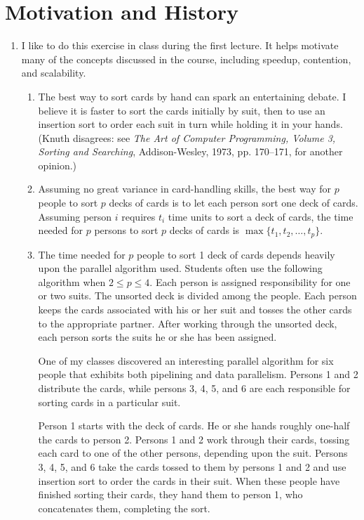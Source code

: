 \chapter{Motivation and History}
\begin{enumerate}
\item I like to do this exercise in class during the first lecture.
      It helps motivate many of the concepts discussed in the course, including
      speedup, contention, and scalability.

      \begin{enumerate}
      \item
      The best way to sort cards by hand can spark an entertaining debate.
      I believe it is faster to sort the cards initially by suit, then to
      use an insertion sort to order each suit in turn while holding it in
      your hands.
      (Knuth disagrees:  see {\sl The Art of Computer Programming,
      Volume 3, Sorting and Searching\/}, Addison-Wesley, 1973, pp. 170--171,
      for another opinion.)

      \item
      Assuming no great variance in card-handling skills, the best
      way for $p$ people to sort $p$ decks of cards is to let each person sort
      one deck of cards.
      Assuming person $i$ requires $t_i$ time units to sort a deck of cards,
      the time needed for $p$ persons to sort $p$ decks of cards is
      $\max \{t_1, t_2, \ldots, t_p\}$.

      \item
      The time needed for $p$ people to sort 1 deck of cards depends heavily
      upon the parallel algorithm used. Students often use the following
      algorithm when $2 \le p \le 4$. Each person is assigned responsibility
      for one or two suits.
      The unsorted deck is divided among the people. Each person keeps the
      cards associated with his or her suit and tosses the other cards to the
      appropriate partner. After working through the unsorted deck, each person
      sorts the suits he or she has been assigned.
      
      One of my classes discovered an interesting
      parallel algorithm for six people that exhibits both
      pipelining and data parallelism.  Persons 1 and 2 distribute
      the cards, while persons 3, 4, 5, and 6 are each responsible
      for sorting cards in a particular suit.

      Person 1 starts with the deck of cards.  He or
      she hands roughly one-half the cards to person 2.  Persons 1 and
      2 work through their cards, tossing each card to one of the
      other persons, depending upon the suit.  Persons 3, 4, 5, and 6
      take the cards tossed to them by persons 1 and 2 and use insertion
      sort to order the cards in their suit.
      When these people have finished sorting
      their cards, they hand them to person 1, who concatenates them,
      completing the sort.
      \end{enumerate}


\end{enumerate}
